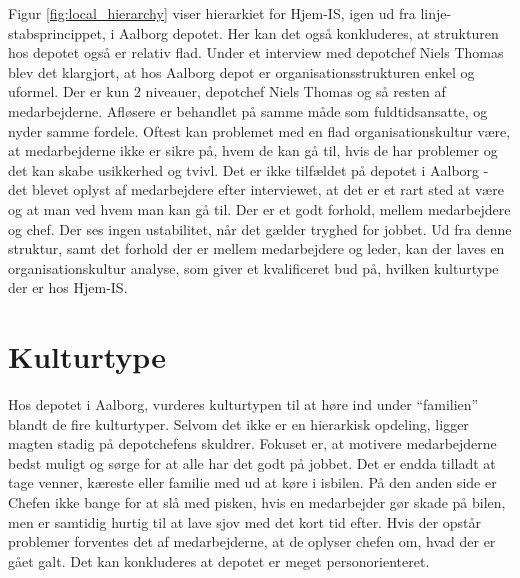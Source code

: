 Figur \ref{fig:local_hierarchy} viser hierarkiet for Hjem-IS, igen ud fra linje-stabsprincippet\cite{Organisation}, i Aalborg depotet. Her kan det også konkluderes, at strukturen hos depotet også er relativ flad. Under et interview med depotchef Niels Thomas blev det klargjort, at hos Aalborg depot er organisationsstrukturen enkel og uformel. Der er kun 2 niveauer, depotchef Niels Thomas og så resten af medarbejderne. Afløsere er behandlet på samme måde som fuldtidsansatte, og nyder samme fordele. Oftest kan problemet med en flad organisationskultur være, at medarbejderne ikke er sikre på, hvem de kan gå til, hvis de har problemer og det kan skabe usikkerhed og tvivl. Det er ikke tilfældet på depotet i Aalborg - det blevet oplyst af medarbejdere efter interviewet, at det er et rart sted at være og at man ved hvem man kan gå til. Der er et godt forhold, mellem medarbejdere og chef. Der ses ingen ustabilitet, når det gælder tryghed for jobbet. Ud fra denne struktur, samt det forhold der er mellem medarbejdere og leder, kan der laves en organisationskultur analyse, som giver et kvalificeret bud på, hvilken kulturtype der er hos Hjem-IS.

\section{Kulturtype}
Hos depotet i Aalborg, vurderes kulturtypen til at høre ind under “familien” blandt de fire kulturtyper\cite{Organisation}. Selvom det ikke er en hierarkisk opdeling, ligger magten stadig på depotchefens skuldrer. Fokuset er, at motivere medarbejderne bedst muligt og sørge for at alle har det godt på jobbet. Det er endda tilladt at tage venner, kæreste eller familie med ud at køre i isbilen. På den anden side er Chefen ikke bange for at slå med pisken, hvis en medarbejder gør skade på bilen, men er samtidig hurtig til at lave sjov med det kort tid efter. Hvis der opstår problemer forventes det af medarbejderne, at de oplyser chefen om, hvad der er gået galt. 
Det kan konkluderes at depotet er meget personorienteret.

